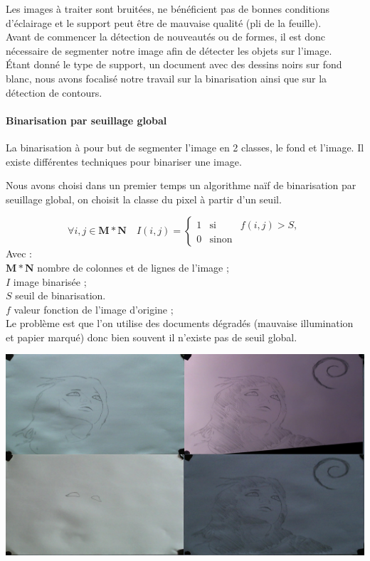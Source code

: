Les images à traiter sont bruitées, ne bénéficient pas de bonnes conditions d'éclairage et le support peut être de mauvaise qualité (pli de la feuille).\\
Avant de commencer la détection de nouveautés ou de formes, il est donc nécessaire de segmenter notre image afin de détecter les objets sur l'image.\\
Étant donné le type de support, un document avec des dessins noirs sur fond blanc, nous avons focalisé notre travail sur la binarisation ainsi que sur la détection de contours.

\paragraph{Binarisation par seuillage global\vspace{0.5cm}\\}

La binarisation à pour but de segmenter l'image en 2 classes, le fond et l'image.
Il existe différentes techniques pour binariser une image.

Nous avons choisi dans un premier temps un algorithme naïf de binarisation par seuillage global, on choisit la classe du pixel à partir d'un seuil.

\begin{equation}
	\forall i,j \in \mathbf{M*N} \quad I(i,j)=
	\left\lbrace
	\begin{array}{ccc}
		1 &\mbox{si}& f(i,j) > S,\\
		0 &\mbox{sinon}&
	\end{array}\right.
\end{equation}
Avec : \\
$\mathbf{M*N}$ nombre de colonnes et de lignes de l’image ;\\
$I$ image binarisée ;\\
$S$ seuil de binarisation.\\
$f$ valeur fonction de l’image d’origine ;\\


Le problème est que l'on utilise des documents dégradés (mauvaise illumination et papier marqué) donc bien souvent il n'existe pas de seuil global.

\begin{center}
\includegraphics[width=\textwidth]{images/diffEclairage.png}
\end{center}

